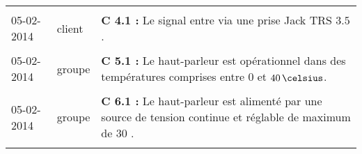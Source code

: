\begin{table}
\begin{tabular}{|p{2cm}|p{1.5cm}|p{}|}
	& &\\
	 	05-02-2014 & client & \textbf{C 4.1 :} Le signal entre via une prise Jack TRS $3.5$ \milli \meter.\\
	& &\\
		05-02-2014 & groupe & \textbf{C 5.1 :} Le haut-parleur est opérationnel dans des températures comprises entre $0$ et $40\,\celsius$.\\
	& &\\
		05-02-2014 & groupe & \textbf{C 6.1 :} Le haut-parleur est alimenté par une source de tension continue et réglable de maximum de $30$ \volt.\\
	 & &\\
\hline
 \end{tabular}
 \end{table}
